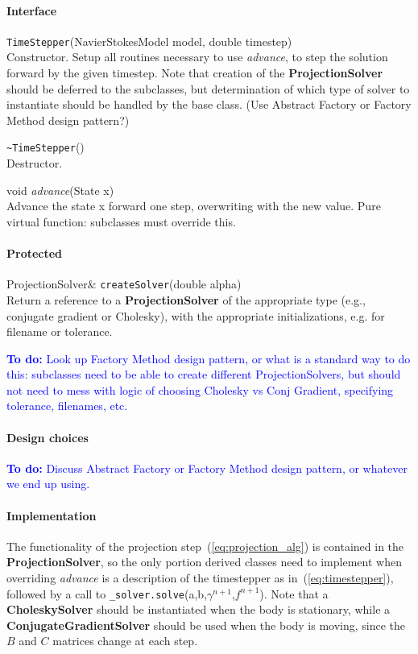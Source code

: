\documentclass[11pt]{article}
\def\todo#1{\textcolor{blue}{{\bf To do:} #1}}
\def\class#1{{\bf #1}} %
\def\fn#1{{\tt #1}} %
\def\virtualfn#1{{\it #1}} %
\begin{document}
\paragraph{Interface}
\begin{description}
	\item \fn{TimeStepper}(NavierStokesModel model, double timestep)\\
		Constructor.  Setup all routines necessary to use \virtualfn{advance}, to step the solution forward by the given timestep.  Note that creation of the \class{ProjectionSolver} should be deferred to the subclasses, but determination of which type of solver to instantiate should be handled by the base class.  (Use Abstract Factory or Factory Method design pattern?)
	\item \fn{\~\null TimeStepper}()\\
		Destructor.
	\item void \virtualfn{advance}(State x)\\
	 	Advance the state x forward one step, overwriting with the new value.  Pure virtual function: subclasses must override this.
\end{description}
\paragraph{Protected}
\begin{description}
	\item ProjectionSolver\& \fn{createSolver}(double alpha)\\
		Return a reference to a \class{ProjectionSolver} of the appropriate type (e.g., conjugate gradient or Cholesky), with the appropriate initializations, e.g. for filename or tolerance.
		
		\todo{Look up Factory Method design pattern, or what is a standard way to do this: subclasses need to be able to create different ProjectionSolvers, but should not need to mess with logic of choosing Cholesky vs Conj Gradient, specifying tolerance, filenames, etc.}
\end{description}

\paragraph{Design choices}
\todo{Discuss Abstract Factory or Factory Method design pattern, or whatever we end up using.}

\paragraph{Implementation}
The functionality of the projection step~(\ref{eq:projection_alg}) is contained in the \class{ProjectionSolver}, so the only portion derived classes need to implement when overriding \virtualfn{advance} is a description of the timestepper as in~(\ref{eq:timestepper}), followed by a call to \fn{\_solver.solve}(a,b,$\gamma^{n+1}$,$f^{n+1}$).  Note that a \class{CholeskySolver} should be instantiated when the body is stationary, while a \class{ConjugateGradientSolver} should be used when the body is moving, since the $B$ and $C$ matrices change at each step.
\end{document}

